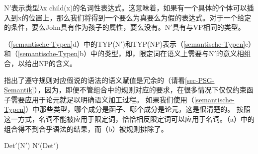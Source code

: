 N$'$表示类型$\lambda$x child(x)的名词性表达式。这意味着，如果有一个具体的个体可以插入到x的位置上，那么我们将得到一个要么为真要么为假的表达式。对于一个给定的条件，要么John具有作为孩子的属性，要么没有。N$'$具有与VP相同的类型。

（\ref{semantische-Typen}d）中的TYP(N$'$)和TYP(NP)表示（\ref{semantische-Typen}c）和（\ref{semantische-Typen}b）中的类型，即，限定词在语义上需要与N$'$的意义相组合，以给出NP的含义。

\citet*[]{GKPS85a}指出了遵守规则对应假说的语法的语义赋值是冗余的（请看\ref{sec-PSG-Semantik}），因为，即便不管组合中的规则对应的要求，在很多情况下仅仅约束函子需要应用于论元就足以明确语义加工过程。
如果我们使用（\ref{semantische-Typen}）中那些类型，哪个成分是函子、哪个成分是论元，这是很清楚的。
按照这一方式，名词不能被应用于限定词，恰恰相反限定词可以应用于名词。（a）中的组合得不到合乎语法的结果，而（b）被规则排除了。

\begin{samepage}
\eal
\ex Det$'$(N$'$)
\ex N$'$(Det$'$)
\zl
\end{samepage}

